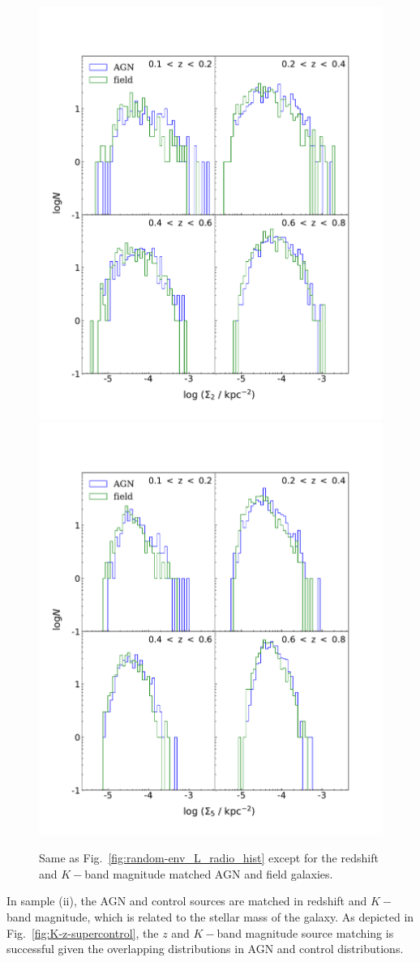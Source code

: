 \begin{figure}
\hspace*{-50pt}
   \includegraphics[width=0.6\columnwidth]{plots_chp2/control_env_2_histogram.pdf}
   \includegraphics[width=0.6\columnwidth]{plots_chp2/control_env_5_histogram.pdf}
   \caption[Sample (ii): $\Sigma_2$ and $\Sigma_5$ histograms]{Same as Fig.~\ref{fig:random-env_L_radio_hist} except for the redshift and $K-$band magnitude matched AGN and field galaxies.}
   \label{fig:control-env_L_radio_hist}
 \end{figure}

In sample (ii), the AGN and control sources are matched in redshift and $K-$band magnitude, which is related to the stellar mass of the galaxy. As depicted in Fig.~\ref{fig:K-z-supercontrol}, the $z$ and $K-$band magnitude source matching is successful given the overlapping distributions in AGN and control distributions.

